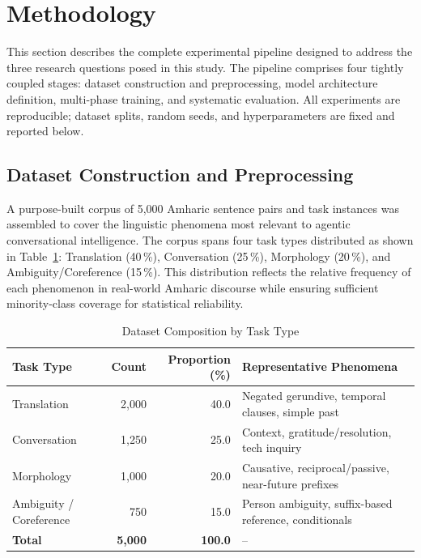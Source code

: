 \section{Methodology}
\label{sec:methodology}

This section describes the complete experimental pipeline designed to address the three research
questions posed in this study. The pipeline comprises four tightly coupled stages: dataset
construction and preprocessing, model architecture definition, multi-phase training, and
systematic evaluation. All experiments are reproducible; dataset splits, random seeds, and
hyperparameters are fixed and reported below.

\subsection{Dataset Construction and Preprocessing}
\label{sec:data}

A purpose-built corpus of 5{,}000 Amharic sentence pairs and task instances was assembled to
cover the linguistic phenomena most relevant to agentic conversational intelligence.  The corpus
spans four task types distributed as shown in Table~\ref{tab:dataset}: Translation (40\,\%),
Conversation (25\,\%), Morphology (20\,\%), and Ambiguity/Coreference (15\,\%).  This
distribution reflects the relative frequency of each phenomenon in real-world Amharic discourse
while ensuring sufficient minority-class coverage for statistical reliability.

\begin{table}[htbp]
  \centering
  \caption{Dataset Composition by Task Type}
  \label{tab:dataset}
  \begin{tabularx}{\columnwidth}{lrrX}
    \toprule
    \textbf{Task Type} & \textbf{Count} & \textbf{Proportion (\%)} & \textbf{Representative Phenomena} \\
    \midrule
    Translation                & 2{,}000 & 40.0 & Negated gerundive, temporal clauses, simple past \\
    Conversation               & 1{,}250 & 25.0 & Context, gratitude/resolution, tech inquiry \\
    Morphology                 & 1{,}000 & 20.0 & Causative, reciprocal/passive, near-future prefixes \\
    Ambiguity / Coreference    &   750 & 15.0 & Person ambiguity, suffix-based reference, conditionals \\
    \midrule
    \textbf{Total}             & \textbf{5{,}000} & \textbf{100.0} & -- \\
    \bottomrule
  \end{tabularx}
\end{table}

